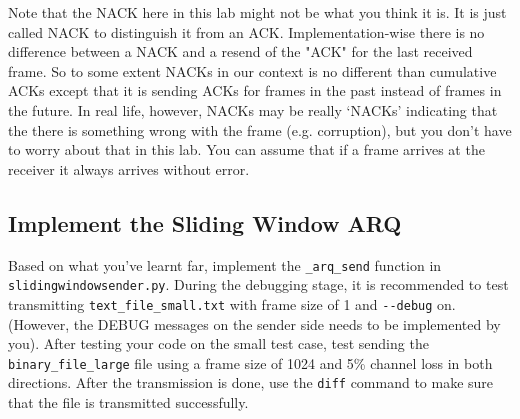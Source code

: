 \documentclass[11pt]{article}
\begin{document}
Note that the NACK here in this lab might not be what you think it is. It is just called NACK to distinguish it from an ACK.
Implementation-wise there is no difference between a NACK and a resend of the "ACK" for the last received frame.
So to some extent NACKs in our context is no different than cumulative ACKs except that it is sending ACKs for frames in the past instead of frames in the future.
In real life, however, NACKs may be really `NACKs' indicating that the there is something wrong with the frame (e.g. corruption), but you don't have to worry about that in this lab. You can assume that if a frame arrives at the receiver it always arrives without error.


\subsection{Implement the Sliding Window ARQ}
Based on what you've learnt far, implement the \texttt{\_arq\_send} function in \texttt{slidingwindowsender.py}.
During the debugging stage, it is recommended to test transmitting \texttt{text\_file\_small.txt} with frame size of 1 and \texttt{-{}-debug} on.
(However, the DEBUG messages on the sender side needs to be implemented by you).
After testing your code on the small test case, test sending the \texttt{binary\_file\_large} file using a frame size of 1024 and 5\% channel loss in both directions.
After the transmission is done, use the \texttt{diff} command to make sure that the file is transmitted successfully.


\end{document}
